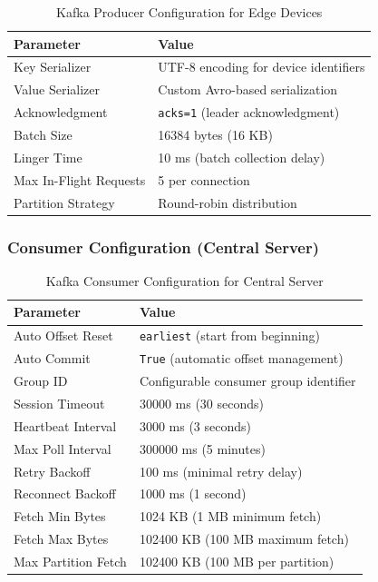 \documentclass[../main.tex]{subfiles}
\begin{document}
\begin{table}[htbp]
\centering
\caption{Kafka Producer Configuration for Edge Devices}
\label{tab:producer_config}
\begin{tabular}{|p{4cm}|p{8cm}|}
\hline
\textbf{Parameter} & \textbf{Value} \\
\hline

Key Serializer & UTF-8 encoding for device identifiers \\
Value Serializer & Custom Avro-based serialization \\
Acknowledgment & \texttt{acks=1} (leader acknowledgment) \\
Batch Size & 16384 bytes (16 KB) \\
Linger Time & 10 ms (batch collection delay) \\
Max In-Flight Requests & 5 per connection \\
Partition Strategy & Round-robin distribution \\
\hline
\end{tabular}
\end{table}

\newpage

\subsubsection{Consumer Configuration (Central Server)}

\begin{table}[!htbp]
\centering
\caption{Kafka Consumer Configuration for Central Server}
\label{tab:consumer_config}
\begin{tabular}{|p{4cm}|p{8cm}|}
\hline
\textbf{Parameter} & \textbf{Value} \\
\hline
Auto Offset Reset & \texttt{earliest} (start from beginning) \\
Auto Commit & \texttt{True} (automatic offset management) \\
Group ID & Configurable consumer group identifier \\
Session Timeout & 30000 ms (30 seconds) \\
Heartbeat Interval & 3000 ms (3 seconds) \\
Max Poll Interval & 300000 ms (5 minutes) \\
Retry Backoff & 100 ms (minimal retry delay) \\
Reconnect Backoff & 1000 ms (1 second) \\
Fetch Min Bytes & 1024 KB (1 MB minimum fetch) \\
Fetch Max Bytes & 102400 KB (100 MB maximum fetch) \\
Max Partition Fetch & 102400 KB (100 MB per partition) \\
\hline
\end{tabular}
\end{table}
\end{document}

